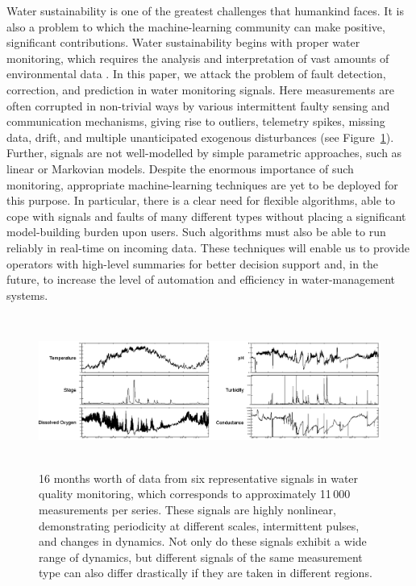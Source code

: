 \documentclass{article}
\begin{document}
Water sustainability is one of the greatest challenges that humankind
faces. It is also a problem to which the machine-learning community
can make positive, significant contributions. Water sustainability
begins with proper water monitoring, which requires the analysis and
interpretation of vast amounts of environmental data
\citep{wagner2006guidelines}. In this paper, we attack the problem of
fault detection, correction, and prediction in water monitoring
signals.  Here measurements are often corrupted in non-trivial ways by
various intermittent faulty sensing and communication mechanisms,
giving rise to outliers, telemetry spikes, missing data, drift, and
multiple unanticipated exogenous disturbances (see
Figure~\ref{fig:monitoring}).  Further, signals are not well-modelled
by simple parametric approaches, such as linear or Markovian
models. Despite the enormous importance of such monitoring,
appropriate machine-learning techniques are yet to be deployed for
this purpose. In particular, there is a clear need for flexible
algorithms, able to cope with signals and faults of many different
types without placing a significant model-building burden upon
users. Such algorithms must also be able to run reliably in real-time
on incoming data.
These techniques will enable us to provide operators with high-level
summaries for better decision support and, in the future, to increase
the level of automation and efficiency in water-management systems.

\begin{figure}[t!]
\begin{center}
 \includegraphics[width=\textwidth, height=5cm]{watermonitoring.eps}
\end{center}
\caption{16 months worth of data from six representative
signals in water quality monitoring,
which corresponds to approximately 11\,000 measurements per series.
These signals are highly nonlinear, demonstrating periodicity at
different scales,
intermittent pulses, and changes in dynamics. Not only do these
signals exhibit a wide range of dynamics,
but different signals of the same measurement type can also differ
drastically if they are taken in different regions.
}
\label{fig:monitoring}
\end{figure}
\end{document}
